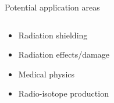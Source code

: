 \documentclass[xcolor=x11names,compress]{beamer}
\renewcommand{\(}{\begin{columns}}
\renewcommand{\)}{\end{columns}}
\newcommand{\<}[1]{\begin{column}{#1}}
\renewcommand{\>}{\end{column}}
\begin{document}
\begin{frame}{Potential application areas}
  \begin{columns}
    \begin{column}{0.5\linewidth}
      \begin{itemize}
        \item Radiation shielding
        \item Radiation effects/damage
        \item Medical physics
        \item Radio-isotope production
      \end{itemize}
      \renewcommand*{\thesubfigure}{}
      \vspace{-0.5cm}
      \begin{figure}[htp]
        \centering
        \subcapcentertrue
      \end{figure}
    \end{column}
    

\end{columns}
\end{frame}
\end{document}
